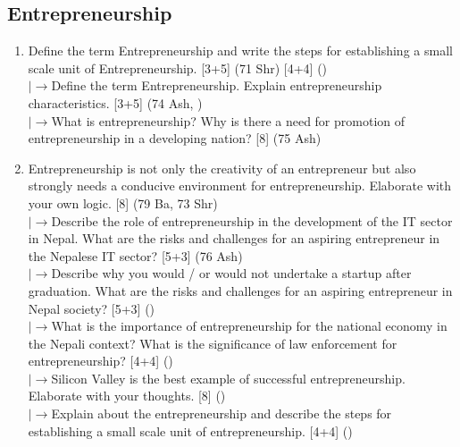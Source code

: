\documentclass[12pt]{article}
\newcommand{\lb}{\\$\left|\rightarrow\right.$}
\begin{document}
  \subsection{Entrepreneurship}
    \begin{enumerate}[topsep=0pt, noitemsep]
      \item Define the term Entrepreneurship and write the steps for establishing a small scale unit of Entrepreneurship. \hfill [3+5] (71 Shr) [4+4] ()
        \lb Define the term Entrepreneurship. Explain entrepreneurship characteristics. \hfill [3+5] (74 Ash, )
        \lb What is entrepreneurship? Why is there a need for promotion of entrepreneurship in a developing nation? \hfill [8] (75 Ash)

      \item Entrepreneurship is not only the creativity of an entrepreneur but also strongly needs a conducive environment for entrepreneurship. Elaborate with your own logic. \hfill [8] (79 Ba, 73 Shr)
        \lb Describe the role of entrepreneurship in the development of the IT sector in Nepal. What are the risks and challenges for an aspiring entrepreneur in the Nepalese IT sector? \hfill [5+3] (76 Ash)
        \lb Describe why you would / or would not undertake a startup after graduation. What are the risks and challenges for an aspiring entrepreneur in Nepal society? \hfill [5+3] ()
        \lb What is the importance of entrepreneurship for the national economy in the Nepali context? What is the significance of law enforcement for entrepreneurship? \hfill [4+4] ()
        \lb Silicon Valley is the best example of successful entrepreneurship. Elaborate with your thoughts. \hfill [8] ()
        \lb Explain about the entrepreneurship and describe the steps for establishing a small scale unit of entrepreneurship. \hfill [4+4] ()
    \end{enumerate}

\pagebreak
\end{document}
